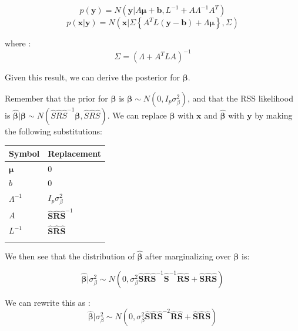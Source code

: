 $$ p(\textbf{y}) = N(\textbf{y}|A\boldsymbol{\mu}+\textbf{b},L^{-1}+A\Lambda^{-1}A^{T})$$
$$p(\textbf{x}|\textbf{y}) = N(\textbf{x}| \Sigma \left\{ A^{T} L ( \textbf{y} - \textbf{b} ) + \Lambda \boldsymbol{\mu} \right\} , \Sigma)$$

where :
$$\Sigma = (\Lambda + A^{T}LA)^{-1}$$

Given this result, we can derive the posterior for \(\boldsymbol{\beta}\).

Remember that the prior for \(\boldsymbol{\beta}\) is \(\boldsymbol{\beta} \sim N(0,I_p\sigma^2_\beta)\), and that the RSS likelihood is \(\hat{\boldsymbol{\beta}} | \boldsymbol{\beta} \sim N(\hat{S}\hat{R}\hat{S}^{-1}\boldsymbol{\beta},\hat{S}\hat{R}\hat{S})\).  
We can replace \(\boldsymbol{\beta}\) with \(\textbf{x}\) and \(\hat{\boldsymbol{\beta}}\) with \(\textbf{y}\) by making the following substitutions:

\begin{center}
\begin{tabular}{ll}
Symbol & Replacement\\
\hline
\(\boldsymbol{\mu}\) & \(0\)\\
\(b\) & \(0\)\\
\(\Lambda^{-1}\) & \(I_p \sigma^2_\beta\)\\
\(A\) & \(\hat{\textbf{S}}\hat{\textbf{R}}\hat{\textbf{S}}^{-1}\)\\
\(L^{-1}\) & \(\hat{\textbf{S}}\hat{\textbf{R}}\hat{\textbf{S}}\)\\
 & \\
\end{tabular}
\end{center}

We then see that the distribution of \(\hat{\boldsymbol{\beta}}\) after marginalizing over $\boldsymbol{\beta}$ is:

$$ \hat{\boldsymbol{\beta}}|\sigma_\beta^2 \sim N(0,\sigma_\beta^2\hat{\textbf{S}}\hat{\textbf{R}}\hat{\textbf{S}}^{-1}\hat{\textbf{S}}^{-1}\hat{\textbf{R}}\hat{\textbf{S}}+\hat{\textbf{S}}\hat{\textbf{R}}\hat{\textbf{S}})$$ 

We can rewrite this as :
$$\hat{\boldsymbol{\beta}}|\sigma_\beta^2 \sim  N(0,\sigma_\beta^2\hat{\textbf{S}}\hat{\textbf{R}}\hat{\textbf{S}}^{-2}\hat{\textbf{R}}\hat{\textbf{S}}+\hat{\textbf{S}}\hat{\textbf{R}}\hat{\textbf{S}}) $$

